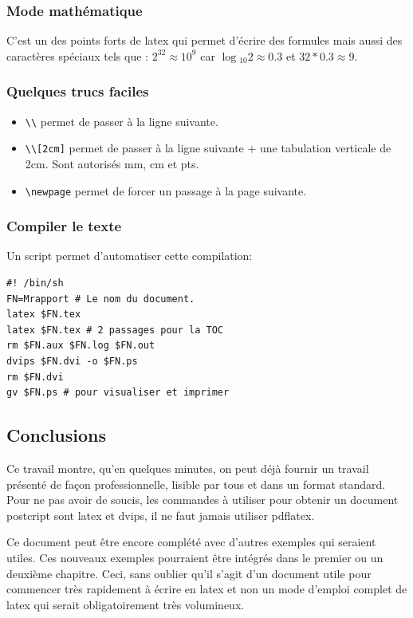 \subsubsection {Mode mathématique}
C'est un des points forts de latex qui permet d'écrire des formules mais aussi des caractères spéciaux tels que :
$2^{32} \approx 10^{9}$ car $\log{_{10}}{2} \approx 0.3$ et $32*0.3 \approx 9$.
\subsubsection {Quelques trucs faciles}
\begin{itemize}
\item \verb+\\+ permet de passer à la ligne suivante.
\item \verb+\\[2cm]+ permet de passer à la ligne suivante + une tabulation verticale de 2cm. Sont autorisés mm, cm et pts.
\item \verb+\newpage+ permet de forcer un passage à la page suivante.
\end{itemize}
\subsubsection {Compiler le texte}
Un script permet d'automatiser cette compilation:
\begin{lstlisting}
#! /bin/sh
FN=Mrapport # Le nom du document.
latex $FN.tex
latex $FN.tex # 2 passages pour la TOC
rm $FN.aux $FN.log $FN.out
dvips $FN.dvi -o $FN.ps
rm $FN.dvi
gv $FN.ps # pour visualiser et imprimer
\end{lstlisting}
\subsection{Conclusions}
Ce travail montre, qu'en quelques minutes, on peut déjà fournir un travail présenté de façon professionnelle, lisible par tous et dans un format standard.
Pour ne pas avoir de soucis, les commandes à utiliser pour obtenir un document postcript sont latex et dvips, il ne faut jamais utiliser pdflatex. 

Ce document peut être encore complété avec d'autres exemples qui seraient utiles. Ces nouveaux exemples pourraient être intégrés dans le premier ou un deuxième chapitre. Ceci, sans oublier qu'il s'agit d'un document utile pour commencer très rapidement à écrire en latex et non un mode d'emploi complet de latex qui serait obligatoirement très volumineux.
